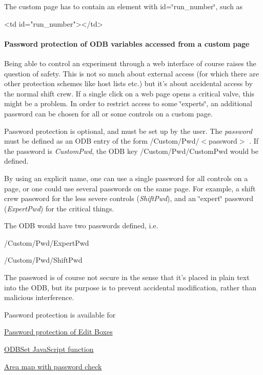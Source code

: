 The custom page has to contain an element with id=\char`\"{}run\_\-number\char`\"{}, such as 
\begin{DoxyCode}
  <td id="run_number"></td>
\end{DoxyCode}
 \par
\par
\hypertarget{RC_mhttpd_custom_ODB_access_features_RC_mhttpd_custom_pw_protection}{}\paragraph{Password protection of ODB variables accessed from a custom page}\label{RC_mhttpd_custom_ODB_access_features_RC_mhttpd_custom_pw_protection}
Being able to control an experiment through a web interface of course raises the question of safety. This is not so much about external access (for which there are other protection schemes like host lists etc.) but it's about accidental access by the normal shift crew. If a single click on a web page opens a critical valve, this might be a problem. In order to restrict access to some \char`\"{}experts\char`\"{}, an additional password can be chosen for all or some controls on a custom page.

Password protection is optional, and must be set up by the user. The {\itshape password\/} must be defined as an ODB entry of the form  /Custom/Pwd/$<$password$>$ . If the password is {\itshape CustomPwd\/}, the ODB key /Custom/Pwd/CustomPwd  would be defined.

By using an explicit name, one can use a single password for all controls on a page, or one could use several passwords on the same page. For example, a shift crew password for the less severe controls ({\itshape ShiftPwd\/}), and an \char`\"{}expert\char`\"{} password ({\itshape ExpertPwd\/}) for the critical things.

The ODB would have two passwords defined, i.e.\par
  /Custom/Pwd/ExpertPwd\par
 /Custom/Pwd/ShiftPwd\par


The password is of course not secure in the sense that it's placed in plain text into the ODB, but its purpose is to prevent accidental modification, rather than malicious interference.

\par
 Password protection is available for
\begin{DoxyItemize}
\item \hyperlink{RC_mhttpd_Image_access_RC_mhttpd_custom_pw}{Password protection of Edit Boxes}
\item \hyperlink{RC_mhttpd_custom_ODB_access_RC_mhttpd_custom_odbset}{ODBSet JavaScript function}
\item \hyperlink{RC_mhttpd_Image_access_RC_mhttpd_custom_imagemap_pw}{Area map with password check}
\end{DoxyItemize}


